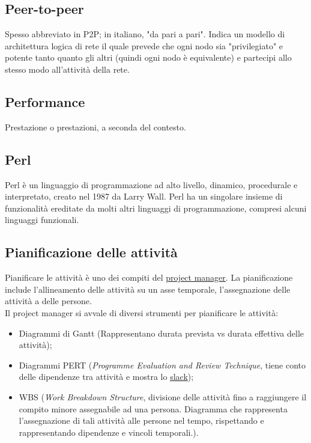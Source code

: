 	\subsection{Peer-to-peer}
	\label{sec:p2p}
	Spesso abbreviato in P2P; in italiano, "da pari a pari". Indica un modello di architettura logica di rete il quale prevede che ogni nodo sia "privilegiato" e potente tanto quanto gli altri (quindi ogni nodo è equivalente) e partecipi allo stesso modo all'attività della rete.

	\subsection{Performance}
	\label{sec:performance}
	Prestazione o prestazioni, a seconda del contesto.

	\subsection{Perl}
	Perl è un linguaggio di programmazione ad alto livello, dinamico, procedurale e interpretato, creato nel 1987 da Larry Wall. Perl ha un singolare insieme di funzionalità ereditate da molti altri linguaggi di programmazione, compresi alcuni linguaggi funzionali.



	\subsection{Pianificazione delle attività}
	\label{sec:pianificazioneattivita}
	Pianificare le attività è uno dei compiti del \underline{\hyperref[sec:projectmanager]{project manager}}.
	La pianificazione include l'allineamento delle attività su un asse temporale, l'assegnazione delle attività a delle persone. \\Il project manager si avvale di diversi strumenti per pianificare le attività:
	\begin{itemize}
	\item Diagrammi di Gantt (Rappresentano durata prevista vs durata effettiva delle attività);
	\item Diagrammi PERT (\emph{Programme Evaluation and Review Technique}, tiene conto delle dipendenze tra attività e mostra lo \hyperref[sec:slack]{slack});
	\item WBS (\emph{Work Breakdown Structure}, divisione delle attività fino a raggiungere il compito minore assegnabile ad una persona. Diagramma che rappresenta l'assegnazione di tali attività alle persone nel tempo, rispettando e rappresentando dipendenze e vincoli temporali.).
	\end{itemize}

